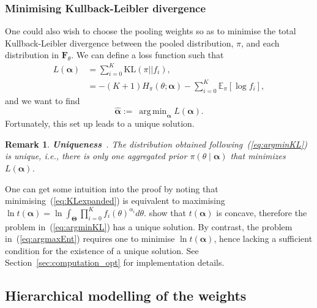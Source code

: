 \documentclass[a4paper, notitlepage, 10pt]{article}
\DeclareMathOperator*{\argmin}{arg\,min}
\newtheorem{remark}{Remark}[]
\begin{document}
\subsubsection{Minimising Kullback-Leibler divergence}
\label{sec:minKL}

One could also wish to choose the pooling weights so as to minimise the total Kullback-Leibler divergence between the pooled distribution, $\pi$, and each distribution in $\mathbf{F}_{\theta}$.
We can define a loss function such that
\begin{align}
\nonumber
L(\boldsymbol\alpha) &= \sum_{i=0}^K  \text{KL}(\pi || f_i), \\
\label{eq:KLexpanded}
     &= - (K+1) H_\pi(\theta; \boldsymbol\alpha)  - \sum_{i=0}^K \mathbb{E}_\pi\left[\log f_i\right], 
\end{align}
and we want to find 
\begin{equation}
\label{eq:argminKL}
    \hat{\boldsymbol\alpha}:= \:\argmin_{\boldsymbol\alpha} L(\boldsymbol\alpha).   
\end{equation}
Fortunately, this set up leads to a unique solution.

\begin{remark}
\label{remark:uniqueness}
\textbf{Uniqueness}~\citep{rufo2012A}.
 The distribution obtained following~(\ref{eq:argminKL}) is unique, i.e., there is only one aggregated prior $\pi(\theta \mid \boldsymbol\alpha)$ that minimizes $L(\boldsymbol\alpha)$.
\end{remark}
One can get some intuition into the proof by noting that minimising~(\ref{eq:KLexpanded}) is equivalent to maximising $\ln t(\boldsymbol\alpha) = \ln\int_{\boldsymbol\Theta}\prod_{i=0}^{K}f_i(\theta)^{\alpha_i}d\theta$. 
\cite{rufo2012A} show that $t(\boldsymbol\alpha)$ is concave, therefore the problem in~(\ref{eq:argminKL}) has a unique solution.
By contrast, the problem in~(\ref{eq:argmaxEnt}) requires one to minimise $\ln t(\boldsymbol\alpha)$, hence lacking a sufficient condition for the existence of a unique solution.
See Section~\ref{sec:computation_opt} for implementation details.

\subsection{Hierarchical modelling of the weights}
\label{sec:hierPrior}
\end{document}
